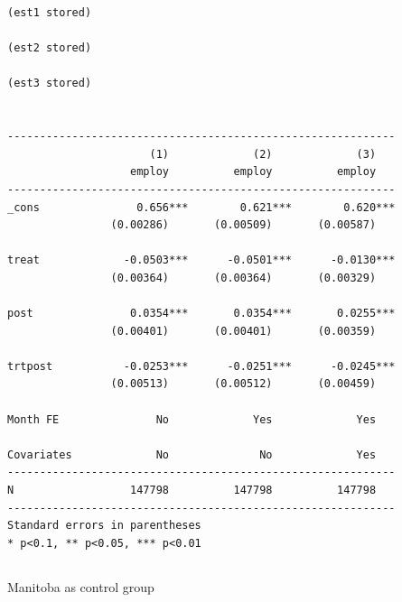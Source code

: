 \documentclass[
  letterpaper,
  DIV=11,
  numbers=noendperiod]{scrartcl}
\begin{document}
\begin{verbatim}
(est1 stored)

(est2 stored)

(est3 stored)


------------------------------------------------------------
                      (1)             (2)             (3)   
                   employ          employ          employ   
------------------------------------------------------------
_cons               0.656***        0.621***        0.620***
                (0.00286)       (0.00509)       (0.00587)   

treat             -0.0503***      -0.0501***      -0.0130***
                (0.00364)       (0.00364)       (0.00329)   

post               0.0354***       0.0354***       0.0255***
                (0.00401)       (0.00401)       (0.00359)   

trtpost           -0.0253***      -0.0251***      -0.0245***
                (0.00513)       (0.00512)       (0.00459)   

Month FE               No             Yes             Yes   

Covariates             No              No             Yes   
------------------------------------------------------------
N                  147798          147798          147798   
------------------------------------------------------------
Standard errors in parentheses
* p<0.1, ** p<0.05, *** p<0.01
\end{verbatim}

\subsection{}\label{section-9}

Manitoba as control group
\end{document}
